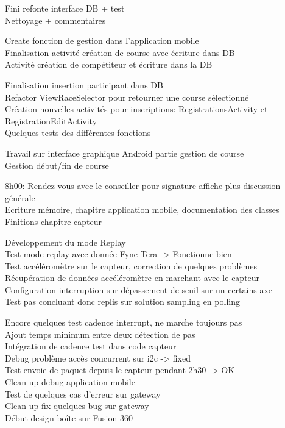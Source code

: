 \begin{multicols}{2}
Fini refonte interface DB + test\\
Nettoyage + commentaires

Create fonction de gestion dans l’application mobile\\
Finalisation activité création de course avec écriture dans DB\\
Activité création de compétiteur et écriture dans la DB

Finalisation insertion participant dans DB\\
Refactor ViewRaceSelector pour retourner une course sélectionné\\
Création nouvelles activités pour inscriptions: RegistrationsActivity et RegistrationEditActivity\\
Quelques tests des différentes fonctions

Travail sur interface graphique Android partie gestion de course\\
Gestion début/fin de course

8h00: Rendez-vous avec le conseiller pour signature affiche plus discussion générale\\
Ecriture mémoire, chapitre application mobile, documentation des classes\\
Finitions chapitre capteur

Développement du mode Replay\\
Test mode replay avec donnée Fyne Tera -> Fonctionne bien\\
Test accéléromètre sur le capteur, correction de quelques problèmes\\
Récupération de données accéléromètre en marchant avec le capteur\\
Configuration interruption sur dépassement de seuil sur un certains axe\\
Test pas concluant donc replis sur solution sampling en polling

Encore quelques test cadence interrupt, ne marche toujours pas\\
Ajout temps minimum entre deux détection de pas\\
Intégration de cadence test dans code capteur\\
Debug problème accès concurrent sur i2c -> fixed\\
Test envoie de paquet depuis le capteur pendant 2h30 -> OK\\
Clean-up debug application mobile\\
Test de quelques cas d’erreur sur gateway\\
Clean-up fix quelques bug sur gateway\\
Début design boîte sur Fusion 360


\end{multicols}
